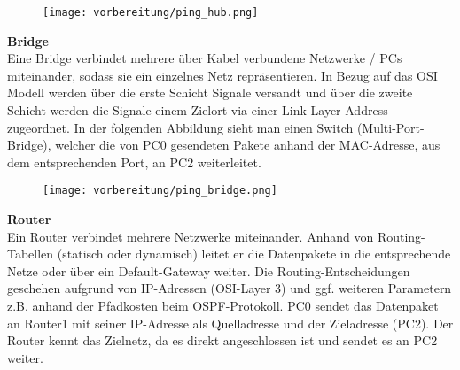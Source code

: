     \begin{figure}[ht]
        \centering
        \texttt{[image: vorbereitung/ping\_hub.png]}
    \end{figure}
    \vspace{0cm}
    \textbf{Bridge}
    \\
    Eine Bridge verbindet mehrere über Kabel verbundene Netzwerke / PCs miteinander, sodass sie ein einzelnes Netz repräsentieren. In Bezug auf das OSI Modell werden über die erste Schicht Signale versandt und über die zweite Schicht werden die Signale einem Zielort via einer Link-Layer-Address zugeordnet. In der folgenden Abbildung sieht man einen Switch (Multi-Port-Bridge), welcher die von PC0 gesendeten Pakete anhand der MAC-Adresse, aus dem entsprechenden Port, an PC2 weiterleitet. \\

    \begin{figure}[ht]
        \centering
        \texttt{[image: vorbereitung/ping\_bridge.png]}
    \end{figure}
    \vspace{0cm}
    \textbf{Router}
    \\
    Ein Router verbindet mehrere Netzwerke miteinander. Anhand von Routing-Tabellen (statisch oder dynamisch) leitet er die Datenpakete in die entsprechende Netze oder über ein Default-Gateway weiter. Die Routing-Entscheidungen geschehen aufgrund von IP-Adressen (OSI-Layer 3) und ggf. weiteren Parametern z.B. anhand der Pfadkosten beim OSPF-Protokoll. PC0 sendet das Datenpaket an Router1 mit seiner IP-Adresse als Quelladresse und der Zieladresse (PC2). Der Router kennt das Zielnetz, da es direkt angeschlossen ist und sendet es an PC2 weiter.\\

